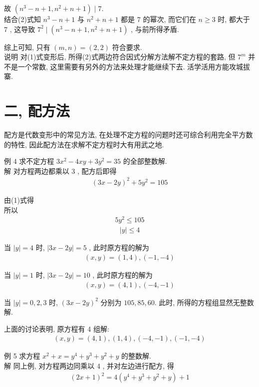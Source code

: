 	故 $\left(n^{3}-n+1, n^{2}+n+1\right) \mid 7$.\\
	结合(2)式知 $n^{3}-n+1$ 与 $n^{2}+n+1$ 都是 7 的幂次, 而它们在 $n \geqslant 3$ 时, 都大于 7 , 这导致 $7^{2} \mid\left(n^{3}-n+1, n^{2}+n+1\right)$ , 与前所得矛盾.

	综上可知, 只有 $(m, n)=(2,2)$ 符合要求.\\
	说明 对(1)式变形后, 所得(2)式两边符合因式分解方法解不定方程的套路, 但 $7^{m}$ 并不是一个常数, 这里需要有另外的方法来处理才能继续下去. 活学活用方能攻城拔寨.

	\section{二, 配方法}
	配方是代数变形中的常见方法, 在处理不定方程的问题时还可综合利用完全平方数的特性, 因此配方法在求解不定方程时大有用武之地.

	例 4 求不定方程 $3 x^{2}-4 x y+3 y^{2}=35$ 的全部整数解. \\
	解 对方程两边都乘以 3 , 配方后即得
\begin{align*}
		(3 x-2 y)^{2}+5 y^{2}=105
	\end{align*}

	由(1)式得\\
	所以
\begin{align*}
		5 y^{2} \leqslant 105
	\end{align*}
\begin{align*}
		|y| \leqslant 4
	\end{align*}

	当 $|y|=4$ 时, $|3 x-2 y|=5$ , 此时原方程的解为
\begin{align*}
		(x, y)=(1,4),(-1,-4)
	\end{align*}

	当 $|y|=1$ 时, $|3 x-2 y|=10$ , 此时原方程的解为
\begin{align*}
		(x, y)=(4,1),(-4,-1)
	\end{align*}

	当 $|y|=0,2,3$ 时, $(3 x-2 y)^{2}$ 分别为 $105,85,60$. 此时, 所得的方程组显然无整数解.

	上面的讨论表明, 原方程有 4 组解: 
\begin{align*}
		(x, y)=(4,1),(1,4),(-4,-1),(-1,-4)
	\end{align*}

	例 5 求方程 $x^{2}+x=y^{4}+y^{3}+y^{2}+y$ 的整数解. \\
	解 同上例, 对方程两边同乘以 4 , 并对左边进行配方, 得
\begin{align*}
		(2 x+1)^{2}=4\left(y^{4}+y^{3}+y^{2}+y\right)+1
	\end{align*}

